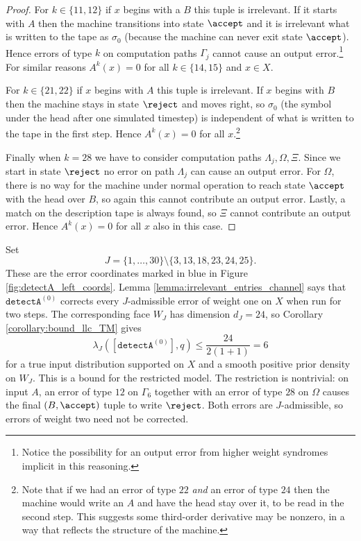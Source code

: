 \documentclass[english,letter paper,12pt,reqno]{article}
\theoremstyle{definition}
\newcommand{\detectA}{\texttt{detectA}}
\begin{document}
\begin{proof}
For $k \in \{11, 12\}$ if $x$ begins with a $B$ this tuple is irrelevant. If it starts with $A$ then the machine transitions into state $\accept$ and it is irrelevant what is written to the tape as $\sigma_0$ (because the machine can never exit state $\accept$). Hence errors of type $k$ on computation paths $\Gamma_j$ cannot cause an output error.\footnote{Notice the possibility for an output error from higher weight syndromes implicit in this reasoning.} For similar reasons $A^k(x) = 0$ for all $k \in \{14, 15\}$ and $x \in X$.

For $k \in \{21, 22\}$ if $x$ begins with $A$ this tuple is irrelevant. If $x$ begins with $B$ then the machine stays in state $\reject$ and moves right, so $\sigma_0$ (the symbol under the head after one simulated timestep) is independent of what is written to the tape in the first step. Hence $A^k(x) = 0$ for all $x$.\footnote{Note that if we had an error of type $22$ \emph{and} an error of type $24$ then the machine would write an $A$ and have the head stay over it, to be read in the second step. This suggests some third-order derivative may be nonzero, in a way that reflects the structure of the machine.}

Finally when $k = 28$ we have to consider computation paths $\Lambda_j, \Omega, \Xi$. Since we start in state $\reject$ no error on path $\Lambda_j$ can cause an output error. For $\Omega$, there is no way for the machine under normal operation to reach state $\accept$ with the head over $B$, so again this cannot contribute an output error. Lastly, a match on the description tape is always found, so $\Xi$ cannot contribute an output error. Hence $A^k(x) = 0$ for all $x$ also in this case.
\end{proof}

Set
\[
J=\{1,\ldots,30\}\setminus\{3,13,18,23,24,25\}.
\]
These are the error coordinates marked in blue in Figure \ref{fig:detectA_left_coords}. Lemma \ref{lemma:irrelevant_entries_channel} says that $\detectA^{(0)}$ corrects every $J$-admissible error of weight one on $X$ when run for two steps. The corresponding face $W_J$ has dimension $d_J=24$, so Corollary \ref{corollary:bound_llc_TM} gives
\[
\lambda_J([\detectA^{(0)}],q)\le \frac{24}{2(1+1)}=6
\]
for a true input distribution supported on $X$ and a smooth positive prior density on $W_J$. This is a bound for the restricted model. The restriction is nontrivial: on input $A$, an error of type $12$ on $\Gamma_6$ together with an error of type $28$ on $\Omega$ causes the final $(B,\accept)$ tuple to write $\reject$. Both errors are $J$-admissible, so errors of weight two need not be corrected.
\end{document}
